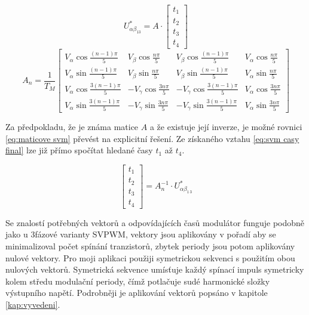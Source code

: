 \begin{equation}
    \label{eq:maticove svm}
    U_{\alpha \beta_{13}}^*=A \cdot 
    \begin{bmatrix}
        t_1\\t_2\\t_3\\t_4   
    \end{bmatrix}
\end{equation}
\begin{equation}    
    \label{eq:svm matica A}
    A_n = \frac{1}{T_M} \begin{bmatrix} 
    V_{\alpha} \cos \frac{(n-1)\pi}{5} & V_{\beta} \cos \frac{n\pi}{5} & V_{\beta} \cos \frac{(n-1)\pi}{5} & V_{\alpha} \cos \frac{n\pi}{5} \\ %
    V_{\alpha} \sin \frac{(n-1)\pi}{5} & V_{\beta} \sin \frac{n\pi}{5} & V_{\beta} \sin \frac{(n-1)\pi}{5} & V_{\alpha} \sin \frac{n\pi}{5} \\
    V_{\alpha} \cos \frac{3(n-1)\pi}{5} & -V_{\gamma} \cos \frac{3n\pi}{5} & -V_{\gamma} \cos \frac{3(n-1)\pi}{5} & V_{\alpha} \cos \frac{3n\pi}{5} \\
    V_{\alpha} \sin \frac{3(n-1)\pi}{5} & -V_{\gamma} \sin \frac{3n\pi}{5} & -V_{\gamma} \sin \frac{3(n-1)\pi}{5} & V_{\alpha} \sin \frac{3n\pi}{5}
    \end{bmatrix}
\end{equation}

Za předpokladu, že je známa matice $A$ a že existuje její inverze, je možné
rovnici \ref{eq:maticove svm} převést na explicitní řešení. Ze získaného vztahu
\ref{eq:svm casy final} lze již přímo spočítat hledané časy $t_1$ až $t_4$.

\begin{equation}
    \label{eq:svm casy final}
      \begin{bmatrix}
        t_1\\t_2\\t_3\\t_4   
    \end{bmatrix}
    = A_n^{-1}\cdot  U_{\alpha \beta_{1\,3}}^*
\end{equation}

Se znalostí potřebných vektorů a odpovídajících časů modulátor funguje podobně jako u 3fázové varianty SVPWM, vektory jsou aplikovány v pořadí aby se minimalizoval počet spínání tranzistorů, zbytek periody jsou potom aplikovány nulové vektory. Pro moji aplikaci použiji symetrickou sekvenci s použitím obou nulových vektorů. Symetrická sekvence umísťuje každý spínací impuls symetricky kolem středu modulační periody, čímž potlačuje sudé harmonické složky výstupního napětí. Podrobněji je aplikování vektorů popsáno v kapitole \ref{kap:vyvedeni}.